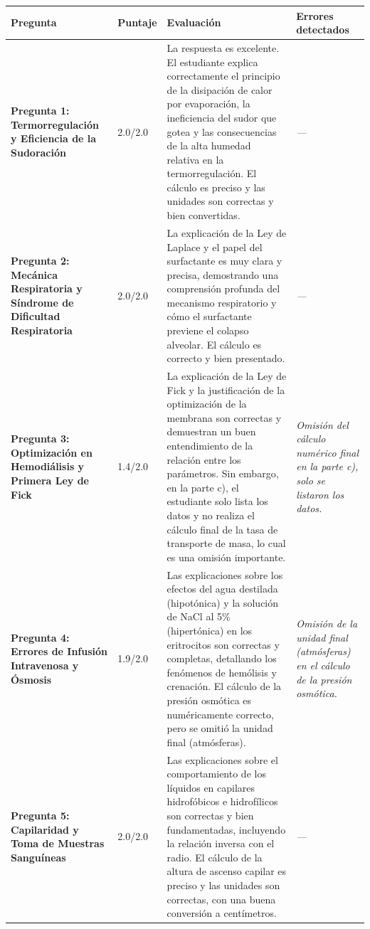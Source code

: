 \documentclass[11pt,a4paper]{article}
\begin{document}
\begin{longtable}{>{\bfseries}p{2.8cm} p{1.6cm} p{7.0cm} p{2.8cm}}
  \toprule
  \textbf{Pregunta} & \textbf{Puntaje} & \textbf{Evaluación} & \textbf{Errores detectados} \\
  \midrule
  \endhead
  \bottomrule
  \endfoot
    \textbf{Pregunta 1: Termorregulación y Eficiencia de la Sudoración} & 2.0/2.0 & La respuesta es excelente. El estudiante explica correctamente el principio de la disipación de calor por evaporación, la ineficiencia del sudor que gotea y las consecuencias de la alta humedad relativa en la termorregulación. El cálculo es preciso y las unidades son correctas y bien convertidas. & \textit{---} \\
    \midrule
    \textbf{Pregunta 2: Mecánica Respiratoria y Síndrome de Dificultad Respiratoria} & 2.0/2.0 & La explicación de la Ley de Laplace y el papel del surfactante es muy clara y precisa, demostrando una comprensión profunda del mecanismo respiratorio y cómo el surfactante previene el colapso alveolar. El cálculo es correcto y bien presentado. & \textit{---} \\
    \midrule
    \textbf{Pregunta 3: Optimización en Hemodiálisis y Primera Ley de Fick} & 1.4/2.0 & La explicación de la Ley de Fick y la justificación de la optimización de la membrana son correctas y demuestran un buen entendimiento de la relación entre los parámetros. Sin embargo, en la parte c), el estudiante solo lista los datos y no realiza el cálculo final de la tasa de transporte de masa, lo cual es una omisión importante. & \textit{Omisión del cálculo numérico final en la parte c), solo se listaron los datos.} \\
    \midrule
    \textbf{Pregunta 4: Errores de Infusión Intravenosa y Ósmosis} & 1.9/2.0 & Las explicaciones sobre los efectos del agua destilada (hipotónica) y la solución de NaCl al 5\% (hipertónica) en los eritrocitos son correctas y completas, detallando los fenómenos de hemólisis y crenación. El cálculo de la presión osmótica es numéricamente correcto, pero se omitió la unidad final (atmósferas). & \textit{Omisión de la unidad final (atmósferas) en el cálculo de la presión osmótica.} \\
    \midrule
    \textbf{Pregunta 5: Capilaridad y Toma de Muestras Sanguíneas} & 2.0/2.0 & Las explicaciones sobre el comportamiento de los líquidos en capilares hidrofóbicos e hidrofílicos son correctas y bien fundamentadas, incluyendo la relación inversa con el radio. El cálculo de la altura de ascenso capilar es preciso y las unidades son correctas, con una buena conversión a centímetros. & \textit{---} \\
    \midrule
\end{longtable}
\end{document}
